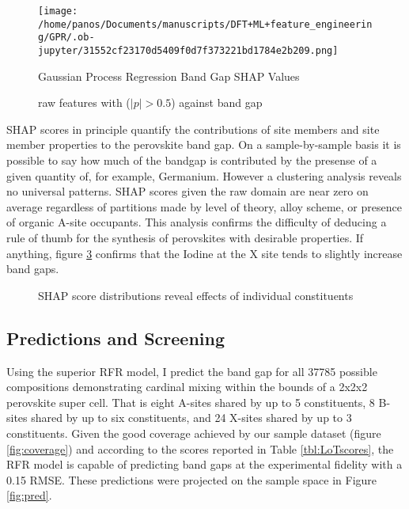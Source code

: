 \begin{figure}[htbp]
\centering
\texttt{[image: /home/panos/Documents/manuscripts/DFT+ML+feature\_engineering/GPR/.ob-jupyter/31552cf23170d5409f0d7f373221bd1784e2b209.png]}
\caption{\label{fig:gprSHAP} Gaussian Process Regression Band Gap SHAP Values}
\end{figure}

 
\begin{figure}[htbp]
\centering

\caption{\label{fig:rpear} raw features with (\(|p| > 0.5\)) against band gap}
\end{figure}

SHAP scores in principle quantify the contributions of site members and site member properties to the perovskite band gap.
On a sample-by-sample basis it is possible to say how much of the bandgap is contributed by the presense of a given quantity of, for example, Germanium.
However a clustering analysis reveals no universal patterns.
SHAP scores given the raw domain are near zero on average regardless of partitions made by level of theory, alloy scheme, or presence of organic A-site occupants.
This analysis confirms the difficulty of deducing a rule of thumb for the synthesis of perovskites with desirable properties.
If anything, figure \ref{fig:clusters} confirms that the Iodine at the X site tends to slightly increase band gaps.

 
\begin{figure}[htbp]
\centering

\caption{\label{fig:clusters} SHAP score distributions reveal effects of individual constituents}
\end{figure}

\subsection{Predictions and Screening}
\label{sec:orgee265d6}
Using the superior RFR model, I predict the band gap for all 37785 possible compositions demonstrating cardinal mixing within the bounds of a 2x2x2 perovskite super cell.
That is eight A-sites shared by up to 5 constituents, 8 B-sites shared by up to six constituents, and 24 X-sites shared by up to 3 constituents.
Given the good coverage achieved by our sample dataset (figure \ref{fig:coverage}) and according to the scores reported in Table \ref{tbl:LoTscores}, the RFR model is capable of predicting band gaps at the experimental fidelity with a 0.15 RMSE.
These predictions were projected on the sample space in Figure \ref{fig:pred}.

